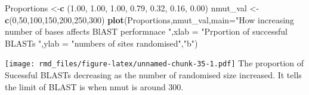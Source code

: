 \documentclass[]{article}
\newenvironment{Shaded}{\begin{snugshade}}{\end{snugshade}}
\newcommand{\DataTypeTok}[1]{\textcolor[rgb]{0.13,0.29,0.53}{#1}}
\newcommand{\DecValTok}[1]{\textcolor[rgb]{0.00,0.00,0.81}{#1}}
\newcommand{\FloatTok}[1]{\textcolor[rgb]{0.00,0.00,0.81}{#1}}
\newcommand{\KeywordTok}[1]{\textcolor[rgb]{0.13,0.29,0.53}{\textbf{#1}}}
\newcommand{\NormalTok}[1]{#1}
\newcommand{\StringTok}[1]{\textcolor[rgb]{0.31,0.60,0.02}{#1}}
\begin{document}
\begin{Shaded}
\begin{Highlighting}[]
\NormalTok{Proportions <-}\KeywordTok{c}\NormalTok{ (}\FloatTok{1.00}\NormalTok{, }\FloatTok{1.00}\NormalTok{, }\FloatTok{1.00}\NormalTok{, }\FloatTok{0.79}\NormalTok{, }\FloatTok{0.32}\NormalTok{, }\FloatTok{0.16}\NormalTok{, }\FloatTok{0.00}\NormalTok{)}
\NormalTok{nmut_val <-}\StringTok{ }\KeywordTok{c}\NormalTok{(}\DecValTok{0}\NormalTok{,}\DecValTok{50}\NormalTok{,}\DecValTok{100}\NormalTok{,}\DecValTok{150}\NormalTok{,}\DecValTok{200}\NormalTok{,}\DecValTok{250}\NormalTok{,}\DecValTok{300}\NormalTok{)}
\KeywordTok{plot}\NormalTok{(Proportions,nmut_val,}\DataTypeTok{main=}\StringTok{"How increasing number of bases affects BlAST performnace  "}\NormalTok{,}\DataTypeTok{xlab =} \StringTok{"Prportion of successful BLASTs "}\NormalTok{,}\DataTypeTok{ylab =} \StringTok{"numbers of sites randomised"}\NormalTok{,}\StringTok{"b"}\NormalTok{)}
\end{Highlighting}
\end{Shaded}

\texttt{[image: rmd\_files/figure-latex/unnamed-chunk-35-1.pdf]} The
proportion of Sucessful BLASTs decreasing as the number of randomised
size increased. It tells the limit of BLAST is when nmut is around 300.
\end{document}
